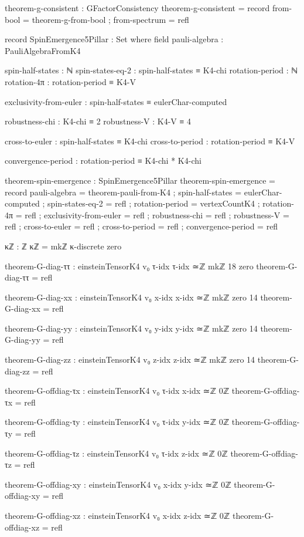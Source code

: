 \documentclass[11pt,a4paper]{book}
\begin{document}
\begin{code}
theorem-g-consistent : GFactorConsistency
theorem-g-consistent = record
  { from-bool = theorem-g-from-bool
  ; from-spectrum = refl
  }

record SpinEmergence5Pillar : Set where
  field
    pauli-algebra    : PauliAlgebraFromK4
    
    spin-half-states : ℕ
    spin-states-eq-2 : spin-half-states ≡ K4-chi
    rotation-period  : ℕ
    rotation-4π      : rotation-period ≡ K4-V
    
    exclusivity-from-euler : spin-half-states ≡ eulerChar-computed
    
    robustness-chi : K4-chi ≡ 2
    robustness-V : K4-V ≡ 4
    
    cross-to-euler : spin-half-states ≡ K4-chi
    cross-to-period : rotation-period ≡ K4-V
    
    convergence-period : rotation-period ≡ K4-chi * K4-chi

theorem-spin-emergence : SpinEmergence5Pillar
theorem-spin-emergence = record
  { pauli-algebra    = theorem-pauli-from-K4
  ; spin-half-states = eulerChar-computed
  ; spin-states-eq-2 = refl
  ; rotation-period  = vertexCountK4
  ; rotation-4π      = refl
  ; exclusivity-from-euler = refl
  ; robustness-chi = refl
  ; robustness-V = refl
  ; cross-to-euler = refl
  ; cross-to-period = refl
  ; convergence-period = refl
  }

κℤ : ℤ
κℤ = mkℤ κ-discrete zero

theorem-G-diag-ττ : einsteinTensorK4 v₀ τ-idx τ-idx ≃ℤ mkℤ 18 zero
theorem-G-diag-ττ = refl

theorem-G-diag-xx : einsteinTensorK4 v₀ x-idx x-idx ≃ℤ mkℤ zero 14
theorem-G-diag-xx = refl

theorem-G-diag-yy : einsteinTensorK4 v₀ y-idx y-idx ≃ℤ mkℤ zero 14
theorem-G-diag-yy = refl

theorem-G-diag-zz : einsteinTensorK4 v₀ z-idx z-idx ≃ℤ mkℤ zero 14
theorem-G-diag-zz = refl

theorem-G-offdiag-τx : einsteinTensorK4 v₀ τ-idx x-idx ≃ℤ 0ℤ
theorem-G-offdiag-τx = refl

theorem-G-offdiag-τy : einsteinTensorK4 v₀ τ-idx y-idx ≃ℤ 0ℤ
theorem-G-offdiag-τy = refl

theorem-G-offdiag-τz : einsteinTensorK4 v₀ τ-idx z-idx ≃ℤ 0ℤ
theorem-G-offdiag-τz = refl

theorem-G-offdiag-xy : einsteinTensorK4 v₀ x-idx y-idx ≃ℤ 0ℤ
theorem-G-offdiag-xy = refl

theorem-G-offdiag-xz : einsteinTensorK4 v₀ x-idx z-idx ≃ℤ 0ℤ
theorem-G-offdiag-xz = refl


\end{code}
\end{document}
